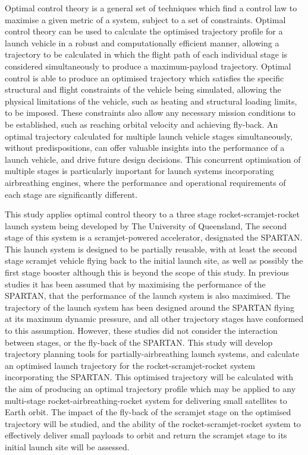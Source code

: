     Optimal control theory is a general set of techniques which find a control law to maximise a given metric of a system, subject to a set of constraints\cite{Rao2009,Betts1998}. 
    Optimal control theory can be used to calculate the optimised trajectory profile for a launch vehicle in a robust and computationally efficient manner, allowing a trajectory to be calculated in which the flight path of each individual stage is considered simultaneously to produce a maximum-payload trajectory\cite{Betts1998}. 
  Optimal control is able to produce an optimised trajectory which satisfies the specific structural and flight constraints of the vehicle being simulated, allowing the physical limitations of the vehicle, such as heating and structural loading limits, to be imposed\cite{Betts1998}. These constraints also allow any necessary mission conditions to be established, such as reaching orbital velocity and achieving fly-back. 
  An optimal trajectory calculated for multiple launch vehicle stages simultaneously, without predispositions, can offer valuable insights into the performance of a launch vehicle, and drive future design decisions. 
  This concurrent optimisation of multiple stages is particularly important for launch systems incorporating airbreathing engines, where the performance and operational requirements of each stage are significantly different.  
  



  
  
  	   This study applies optimal control theory to a three stage rocket-scramjet-rocket launch system being developed by The University of Queensland, The second stage of this system is a scramjet-powered accelerator, designated the SPARTAN\cite{Preller2017b}. This launch system is designed to be partially reusable, with at least the second stage scramjet vehicle flying back to the initial launch site, as well as possibly the first stage booster\cite{Preller2017b} although this is beyond the scope of this study. 
  	   In previous studies it has been assumed that by maximising the performance of the SPARTAN, that the performance of the launch system is also maximised\cite{Preller2017b}. 
  	   The trajectory of the launch system has been designed around the SPARTAN flying at its
  	   maximum dynamic pressure, and all other trajectory stages have conformed to this assumption. However, these studies did not consider the interaction between stages, or the fly-back of the SPARTAN.
  	   This study will develop trajectory planning tools for partially-airbreathing launch systems, and calculate an optimised launch trajectory for the rocket-scramjet-rocket system incorporating the SPARTAN. This optimised trajectory will be calculated with the aim of producing an optimal
  	   trajectory profile which may be applied to any multi-stage rocket-airbreathing-rocket system for delivering small
  	   satellites to Earth orbit. The impact of the fly-back of the scramjet stage on the optimised trajectory will be studied, and the ability of the rocket-scramjet-rocket system to effectively deliver small payloads to orbit and return the scramjet stage to its initial launch site will be assessed. 
  	   
